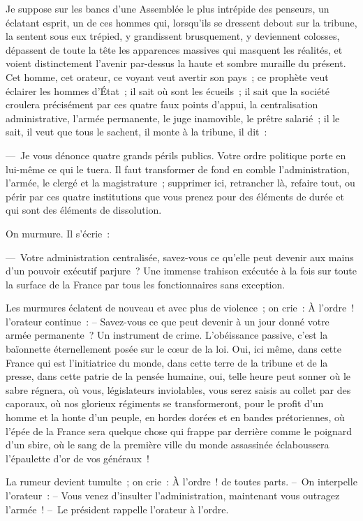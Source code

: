 \documentclass[french,twoside]{book} %
\begin{document}
\noindent Je suppose sur les bancs d’une Assemblée le plus intrépide des penseurs, un éclatant esprit, un de ces hommes qui, lorsqu’ils se dressent debout sur la tribune, la sentent sous eux trépied, y grandissent brusquement, y deviennent colosses, dépassent de toute la tête les apparences massives qui masquent les réalités, et voient distinctement l’avenir par-dessus la haute et sombre muraille du présent. Cet homme, cet orateur, ce voyant veut avertir son pays ; ce prophète veut éclairer les hommes d’État ; il sait où sont les écueils ; il sait que la société croulera précisément par ces quatre faux points d’appui, la centralisation administrative, l’armée permanente, le juge inamovible, le prêtre salarié ; il le sait, il veut que tous le sachent, il monte à la tribune, il dit :\par
— Je vous dénonce quatre grands périls publics. Votre ordre politique porte en lui-même ce qui le tuera. Il faut transformer de fond en comble l’administration, l’armée, le clergé et la magistrature ; supprimer ici, retrancher là, refaire tout, ou périr par ces quatre institutions que vous prenez pour des éléments de durée et qui sont des éléments de dissolution.\par
On murmure. Il s’écrie :\par
— Votre administration centralisée, savez-vous ce qu’elle peut devenir aux mains d’un pouvoir exécutif parjure ? Une immense trahison exécutée à la fois sur toute la surface de la France par tous les fonctionnaires sans exception.\par
Les murmures éclatent de nouveau et avec plus de violence ; on crie : À l’ordre ! l’orateur continue : – Savez-vous ce que peut devenir à un jour donné votre armée permanente ? Un instrument de crime. L’obéissance passive, c’est la baïonnette éternellement posée sur le cœur de la loi. Oui, ici même, dans cette France qui est l’initiatrice du monde, dans cette terre de la tribune et de la presse, dans cette patrie de la pensée humaine, oui, telle heure peut sonner où le sabre régnera, où vous, législateurs inviolables, vous serez saisis au collet par des caporaux, où nos glorieux régiments se transformeront, pour le profit d’un homme et la honte d’un peuple, en hordes dorées et en bandes prétoriennes, où l’épée de la France sera quelque chose qui frappe par derrière comme le poignard d’un sbire, où le sang de la première ville du monde assassinée éclaboussera l’épaulette d’or de vos généraux !\par
La rumeur devient tumulte ; on crie : À l’ordre ! de toutes parts. – On interpelle l’orateur : – Vous venez d’insulter l’administration, maintenant vous outragez l’armée ! – Le président rappelle l’orateur à l’ordre.\par
\end{document}
